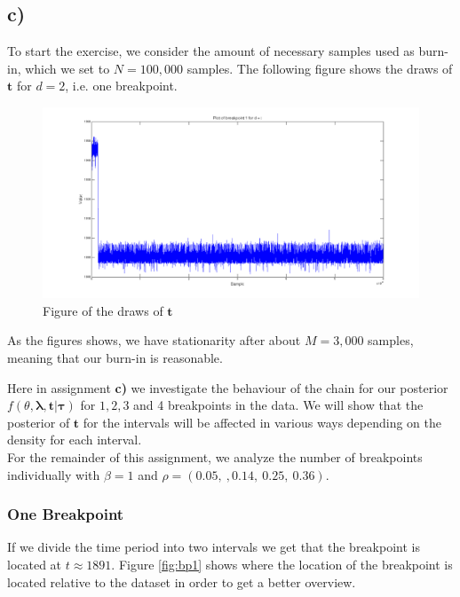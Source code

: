\newpage
\subsection*{c)}
To start the exercise, we consider the amount of necessary samples used as burn-in, which we set to $N = 100,000$ samples. The following figure shows the draws of $\boldsymbol{t}$ for $d=2$, i.e. one breakpoint.

\begin{figure}[H]
\centering
\includegraphics[scale=0.26]{./Figures/iburn.png}
\caption{Figure of the draws of $\boldsymbol{t}$}
\label{fig:burnin}
\end{figure}

As the figures shows, we have stationarity after about $M=3,000$ samples, meaning that our burn-in is reasonable. 

Here in assignment \textbf{c)} we investigate the behaviour of the chain for our posterior $f(\theta,\boldsymbol{\lambda},\boldsymbol{t}|\boldsymbol{\tau})$ for $1,2,3$ and 4 breakpoints in the data. We will show that the posterior of $\boldsymbol{t}$ for the intervals will be affected in various ways depending on the density for each interval.\\

For the remainder of this assignment, we analyze the number of breakpoints individually with $\beta = 1$ and $\rho = (0.05,\:,0.14,\:0.25,\:0.36)$.\\

\newpage
\subsubsection*{One Breakpoint}
If we divide the time period into two intervals we get that the breakpoint is located at $t\approx 1891$. Figure \ref{fig:bp1} shows where the location of the breakpoint is located relative to the dataset in order to get a better overview.

